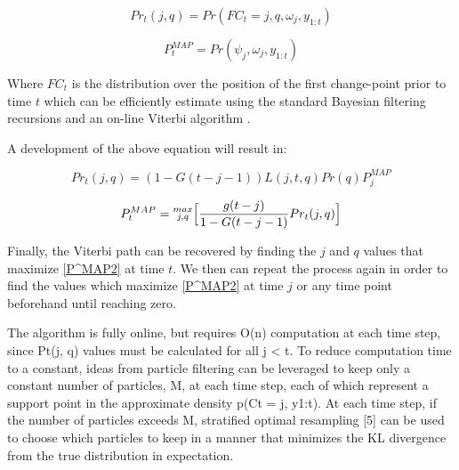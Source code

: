 \documentclass{article}
\begin{document}
\begin{equation}
Pr_t(j,q) = Pr(FC_t=j,q,\omega_j,y_{1:t})
\end{equation}

\begin{equation}
P^{MAP}_t= Pr(\psi_j,\omega_j,y_{1:t})
\end{equation}

Where $FC_t$ is the distribution over the position of the first change-point prior to time $t$ which can be efficiently estimate using the standard Bayesian filtering recursions and an on-line Viterbi algorithm \cite{fearnhead2007line}.

A development of the above equation will result in:

\begin{equation}
Pr_t(j,q) = (1-G(t-j-1))L(j,t,q)Pr(q)P_j^{MAP}
\end{equation}

\begin{equation*}\label{P^MAP2}
P^{MAP}_t=\substack{max\\j,q}\Big{[}\frac{g(t-j)}{1-G(t-j-1)}Pr_t(j,q)\Big{]}
\end{equation*}

Finally, the Viterbi path can be recovered by finding the $j$ and $q$ values that maximize \eqref{P^MAP2} at time $t$. We then can repeat the process again in order to find the values which maximize  \eqref{P^MAP2} at time $j$ or any time point beforehand until reaching zero.


The algorithm is fully online, but requires O(n) computation at each time step, since Pt(j, q) values
must be calculated for all j < t. To reduce computation time to a constant, ideas from particle
filtering can be leveraged to keep only a constant number of particles, M, at each time step, each
of which represent a support point in the approximate density p(Ct = j, y1:t). At each time step,
if the number of particles exceeds M, stratified optimal resampling [5] can be used to choose which
particles to keep in a manner that minimizes the KL divergence from the true distribution in
expectation.
\end{document}
